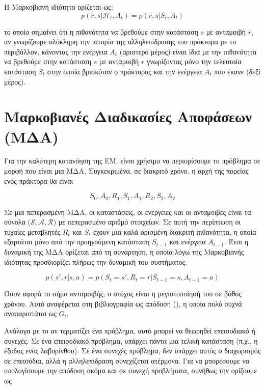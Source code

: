 Η Μαρκοβιανή ιδιότητα ορίζεται ως:
\begin{equation}
    p(r,s | \mathcal{H}_t, A_t) = p(r,s|S_t, A_t)
\end{equation}

το οποίο σημαίνει ότι η πιθανότητα να βρεθούμε στην κατάσταση $s$ με ανταμοιβή $r$, αν γνωρίζουμε
ολόκληρη την ιστορία της αλληλεπίδρασης του πράκτορα με το περιβάλλον, κάνοντας
την ενέργεια $A_t$ (αριστερό μέρος) είναι ίδια με την πιθανότητα να βρεθούμε στην κατάσταση $s$ με
ανταμοιβή $r$ γνωρίζοντας μόνο την τελευταία κατάσταση $S_t$ στην οποία βρισκόταν ο πράκτορας
και την ενέργεια $A_t$ που έκανε (δεξί μέρος).

\section{Μαρκοβιανές Διαδικασίες Αποφάσεων (ΜΔΑ)}

Για την καλύτερη κατανόηση της ΕΜ, είναι χρήσιμο να περιορίσουμε το πρόβλημα σε μορφή που είναι μια ΜΔΑ.
Συγκεκριμένα, σε διακριτό χρόνο, η αρχή της πορείας ενός πράκτορα θα είναι

\begin{equation*}
    S_0, A_0, R_1, S_1, A_1, R_2, S_2, A_2
\end{equation*}

Σε μια πεπερασμένη ΜΔΑ, οι καταστάσεις, οι ενέργειες και οι ανταμοιβές είναι τα σύνολα
($\mathcal{S}, \mathcal{A}, \mathcal{R}$) με πεπερασμένο αριθμό στοιχείων.
Σε αυτή την περίπτωση οι τυχαίες μεταβλητές $R_t$ και $S_t$ έχουν μια καλά ορισμένη διακριτή πιθανότητα,
η οποία εξαρτάται μόνο από την προηγούμενη κατάσταση $S_{t-1}$ και ενέργεια $A_{t-1}$.
Έτσι η δυναμική της ΜΔΑ ορίζεται από τη συνάρτηση, η οποία λόγω της Μαρκοβιανής ιδιότητας προσδιορίζει πλήρως την δυναμική του συστήματος.


\begin{equation}
    p(s', r | s, a) = p(S_t = s', R_t = r | S_{t-1} = s, A_{t-1} = a)
\end{equation}

Όσον αφορά το σήμα ανταμοιβής, ο στόχος είναι η μεγιστοποίησή του σε βάθος χρόνου.
Αυτό αναφέρεται στη βιβλιογραφία ως απόδοση (), η οποία πολύ συχνά αναπαριστάται ως $G_t$.

Ανάλογα με το αν τερματίζει ένα πρόβλημα, αυτό μπορεί να θεωρηθεί επεισοδιακό ή συνεχές. Σε ένα επεισοδιακό πρόβλημα,
υπάρχει πάντα μια τελική κατάσταση (π.χ., η έξοδος ενός λαβυρίνθου).
Σε ένα συνεχές πρόβλημα, δεν υπάρχει αυτός ο διαχωρισμός σε επεισόδια, αλλά η αλληλεπίδραση συνεχίζεται ατέρμονα.
Για να μπορέσουμε να υπολογίσουμε την απόδοση ακόμα και σε συνεχή προβλήματα, συνήθως την ορίζουμε ως


